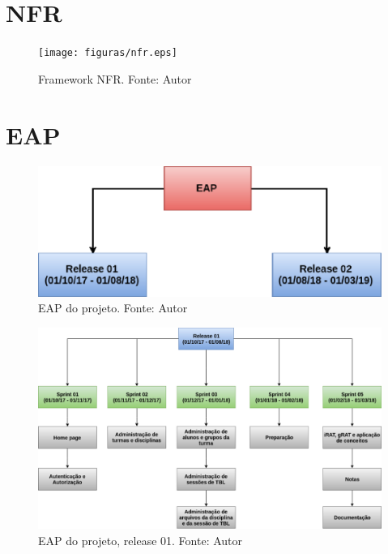 \begin{apendicesenv}

\partapendices

\chapter{NFR} \label{apendice:nfr}

\begin{figure}[h!]
	\centering
  \texttt{[image: figuras/nfr.eps]}
  \caption[Framework NFR.]{Framework NFR. Fonte: Autor}
	\label{fig:nfr}
\end{figure}

\chapter{EAP} \label{apendice:eap}

\begin{figure}[h!]
	\centering
  \includegraphics[keepaspectratio=true,scale=0.8]{figuras/eap1.eps}
  \caption[EAP do projeto.]{EAP do projeto. Fonte: Autor}
	\label{fig:eap}
\end{figure}

\begin{figure}[h!]
	\centering
  \includegraphics[keepaspectratio=true,scale=0.4]{figuras/eap2.eps}
  \caption[EAP do projeto, release 01]{EAP do projeto, release 01. Fonte: Autor}
	\label{fig:eap}
\end{figure}


\end{apendicesenv}
